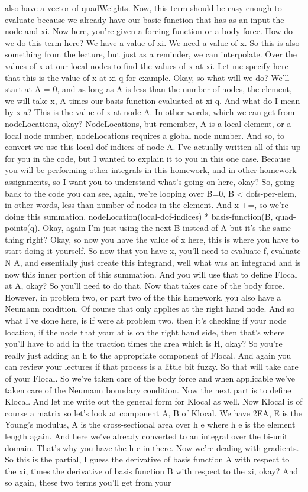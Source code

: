 \documentclass[10pt]{article}
\begin{document}
{also have a vector of quadWeights. Now, this term should be easy enough to evaluate because we already have our basic function that has as an input the node and xi. Now here, you're given a forcing function or a body force. How do we do this term here? We have a value of xi. We need a value of x. So this is also something from the lecture, but just as a reminder, we can interpolate. Over the values of x at our local nodes to find the values of x at xi. Let me specify here that this is the value of x at xi q for example. Okay, so what will we do? We'll start at A = 0, and as long as A is less than the number of nodes, the element, we will take x, A times our basis function evaluated at xi q. And what do I mean by x a? This is the value of x at node A. In other words, which we can get from nodeLocations, okay? NodeLocations, but remember, A is a local element, or a local node number, nodeLocations requires a global node number. And so, to convert we use this local-dof-indices of node A. I've actually written all of this up for you in the code, but I wanted to explain it to you in this one case. Because you will be performing other integrals in this homework, and in other homework assignments, so I want you to understand what's going on here, okay? So, going back to the code you can see, again, we're looping over B=0, B < dofs-per-elem, in other words, less than number of nodes in the element. And x +=, so we're doing this summation, nodeLocation(local-dof-indices) * basis-function(B, quad-points(q). Okay, again I'm just using the next B instead of A but it's the same thing right? Okay, so now you have the value of x here, this is where you have to start doing it yourself. So now that you have x, you'll need to evaluate f, evaluate N A, and essentially just create this integrand, well what was an integrand and is now this inner portion of this summation. And you will use that to define Flocal at A, okay? So you'll need to do that. Now that takes care of the body force. However, in problem two, or part two of the this homework, you also have a Neumann condition. Of course that only applies at the right hand node. And so what I've done here, is if were at problem two, then it's checking if your node location, if the node that your at is on the right hand side, then that's where you'll have to add in the traction times the area which is H, okay? So you're really just adding an h to the appropriate component of Flocal. And again you can review your lectures if that process is a little bit fuzzy. So that will take care of your Flocal. So we've taken care of the body force and when applicable we've taken care of the Neumann boundary condition. Now the next part is to define Klocal. And let me write out the general form for Klocal as well. Now Klocal is of course a matrix so let's look at component A, B of Klocal. We have 2EA, E is the Young's modulus, A is the cross-sectional area over h e where h e is the element length again. And here we've already converted to an integral over the bi-unit domain. That's why you have the h e in there. Now we're dealing with gradients. So this is the partial, I guess the derivative of basis function A with respect to the xi, times the derivative of basis function B with respect to the xi, okay? And so again, these two terms you'll get from your }
\end{document}
